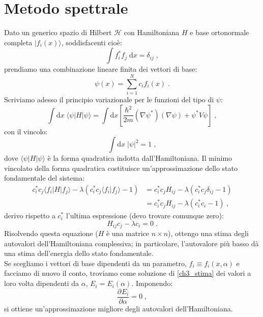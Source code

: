 \documentclass[10pt,a4paper]{report}
\theoremstyle{definition}
\newcommand{\pdev}[3][]{\frac{\partial^{#1} #2}{\partial #3^{#1}}}
\newcommand{\ham}{\mathcal{H}}
\numberwithin{equation}{section}
\newcommand{\diff}[1][]{\mathrm{d}#1}
\newcommand{\bra}{\langle}
\newcommand{\ket}{\rangle}
\begin{document}
\section{Metodo spettrale}
Dato un generico spazio di Hilbert $\ham$ con Hamiltoniana $H$ e base ortonormale completa $|f_i(x)\ket$, soddisfacenti cioè:
$$
\int f_i^*f_j\;\diff{x}=\delta_{ij}\;,
$$
prendiamo una combinazione lineare finita dei vettori di base:
$$
\psi(x)=\sum_{i=1}^N c_if_i(x)\;.
$$
Scriviamo adesso il principio variazionale per le funzioni del tipo di $\psi$:
$$
\int\diff{x}\;\bra\psi|H|\psi\ket=\int\diff{x}\left[\frac{\hbar^2}{2m}(\nabla\psi^*)(\nabla\psi)+\psi^*V\psi\right]\;,
$$
con il vincolo:
$$
\int\diff{x}\;|\psi|^2=1\;,
$$
dove $\bra\psi|H|\psi\ket$ è la forma quadratica indotta dall'Hamiltoniana. Il minimo vincolato della forma quadratica costituisce un'approssimazione dello stato fondamentale del sistema:
\begin{align*}
c_i^*c_j\bra f_i|H|f_j\ket -\lambda\left(c_i^*c_j\bra f_i|f_j\ket-1\right) &=
c_i^*c_j H_{ij}-\lambda(c_i^*c_j\delta_{ij}-1) \\
&= c_i^*c_jH_{ij}-\lambda(c_i^*c_i-1)\;,
\end{align*}
derivo rispetto a $c_i^*$ l'ultima espressione (devo trovare comunque zero):
\begin{equation}
H_{ij}c_j-\lambda c_i=0\;. \label{ch3_stima}
\end{equation}
Risolvendo questa equazione ($H$ è una matrice $n\times n$), ottengo una stima degli autovalori dell'Hamiltoniana complessiva; in particolare, l'autovalore più basso dà una stima dell'energia dello stato fondamentale. \\
Se scegliamo i vettori di base dipendenti da un parametro, $f_i\equiv f_i(x,\alpha)$ e facciamo di nuovo il conto, troviamo come soluzione di \eqref{ch3_stima} dei valori a loro volta dipendenti da $\alpha$, $E_i=E_i(\alpha)$. Imponendo:
$$
\pdev{E_i}{\alpha}=0\;,
$$
si ottiene un'approssimazione migliore degli autovalori dell'Hamiltoniana.
\end{document}
